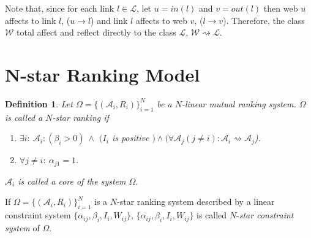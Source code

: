 \documentclass[10pt,leqno,twoside]{article}
\newtheorem{definition}{\indent Definition}[section]
\begin{document}
Note that, since for each link $l\in \mathcal{L}$, let $u=in(l)$ and $v=out(l)$ then web $u$ affects to link $l$, ($u\rightarrow l$) and link $l$ affects to web $v$, ($l\rightarrow v$). Therefore, the class $\mathcal{W}$ total affect and reflect directly to the class $\mathcal{L}$, $\mathcal{W} \rightsquigarrow \mathcal{L}$.


\section {N-star Ranking Model}\label{Sect:N-star}

\begin{definition}
Let $\Omega = \{(\mathcal{A}_i,R_i)\}^N_{i=1}$ be a $N$-linear mutual ranking system. $\Omega$ is called a $N$-\emph{star ranking} if
\begin{enumerate}
\item $\exists i :~ \mathcal{A}_i: (\beta_i >0)~\wedge$ $(I_i$ is positive $)\wedge (\forall \mathcal{A}_j(j\neq i): \mathcal{A}_i\rightsquigarrow\mathcal{A}_j$).
\item $\forall j\neq i :~ \alpha_{j1} = 1.$
\end{enumerate}
$\mathcal{A}_i$ is called a \emph{core} of the system $\Omega$.
\end{definition}

If $\Omega = \{(\mathcal{A}_i,R_i)\}^N_{i=1}$ is a $N$-star ranking system described by a linear constraint system $\{\alpha_{ij},\beta_{i},I_i,W_{ij}\}$, $\{\alpha_{ij},\beta_{i},I_i,W_{ij}\}$ is called $N$-\emph{star constraint system} of $\Omega$.
\end{document}
